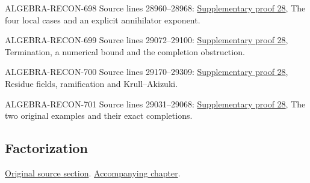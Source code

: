 \begin{AlgebraSourceRoutes}
\item[ALGEBRA-RECON-698] Source lines 28960--28968: \hyperlink{algebra_krull_akizuki_notes_20260928}{Supplementary proof 28}, The four local cases and an explicit annihilator exponent.
\item[ALGEBRA-RECON-699] Source lines 29072--29100: \hyperlink{algebra_krull_akizuki_notes_20260928}{Supplementary proof 28}, Termination, a numerical bound and the completion obstruction.
\item[ALGEBRA-RECON-700] Source lines 29170--29309: \hyperlink{algebra_krull_akizuki_notes_20260928}{Supplementary proof 28}, Residue fields, ramification and Krull–Akizuki.
\item[ALGEBRA-RECON-701] Source lines 29031--29068: \hyperlink{algebra_krull_akizuki_notes_20260928}{Supplementary proof 28}, The two original examples and their exact completions.
\end{AlgebraSourceRoutes}

\subsection{Factorization}
\hypertarget{algebra-source-section-factoring}{}
\noindent\href{https://github.com/stacks/stacks-project/blob/a04446e57ec1fbc252a871afcec7752fb2807b14/algebra.tex\#L29347}{Original source section}. \href{algebra.pdf\#nameddest=section-factoring}{Accompanying chapter}.

